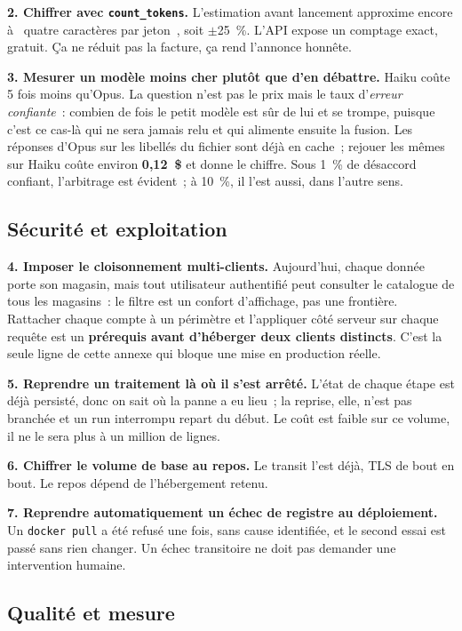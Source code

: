\documentclass[11pt,a4paper]{article}
\newcommand{\code}[1]{\texttt{\small #1}}
\newcommand{\gui}[1]{\guillemotleft{}~#1~\guillemotright{}}
\begin{document}
\textbf{2. Chiffrer avec \code{count\_tokens}.} L'estimation avant lancement approxime encore à
\gui{quatre caractères par jeton}, soit $\pm$25~\%. L'API expose un comptage exact, gratuit. Ça ne
réduit pas la facture, ça rend l'annonce honnête.

\textbf{3. Mesurer un modèle moins cher plutôt que d'en débattre.} Haiku coûte 5 fois moins
qu'Opus. La question n'est pas le prix mais le taux d'\emph{erreur confiante}~: combien de fois le
petit modèle est sûr de lui et se trompe, puisque c'est ce cas-là qui ne sera jamais relu et qui
alimente ensuite la fusion. Les réponses d'Opus sur les libellés du fichier sont déjà en cache~;
rejouer les mêmes sur Haiku coûte environ \textbf{0,12~\$} et donne le chiffre. Sous 1~\% de
désaccord confiant, l'arbitrage est évident~; à 10~\%, il l'est aussi, dans l'autre sens.

\subsection{Sécurité et exploitation}

\textbf{4. Imposer le cloisonnement multi-clients.} Aujourd'hui, chaque donnée porte son magasin,
mais tout utilisateur authentifié peut consulter le catalogue de tous les magasins~: le filtre est
un confort d'affichage, pas une frontière. Rattacher chaque compte à un périmètre et l'appliquer
côté serveur sur chaque requête est un \textbf{prérequis avant d'héberger deux clients distincts}.
C'est la seule ligne de cette annexe qui bloque une mise en production réelle.

\textbf{5. Reprendre un traitement là où il s'est arrêté.} L'état de chaque étape est déjà
persisté, donc on sait où la panne a eu lieu~; la reprise, elle, n'est pas branchée et un run
interrompu repart du début. Le coût est faible sur ce volume, il ne le sera plus à un million de
lignes.

\textbf{6. Chiffrer le volume de base au repos.} Le transit l'est déjà, TLS de bout en bout. Le
repos dépend de l'hébergement retenu.

\textbf{7. Reprendre automatiquement un échec de registre au déploiement.} Un \code{docker pull}
a été refusé une fois, sans cause identifiée, et le second essai est passé sans rien changer. Un
échec transitoire ne doit pas demander une intervention humaine.

\subsection{Qualité et mesure}
\end{document}
